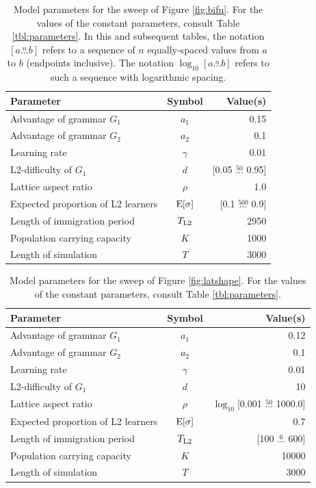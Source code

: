 \begin{table}\caption{Model parameters for the sweep of Figure \ref{fig:bifu}. For the values of the constant parameters, consult Table \ref{tbl:parameters}. In this and subsequent tables, the notation $[a \stackrel{n}{\dots} b]$ refers to a sequence of $n$ equally-spaced values from $a$ to $b$ (endpoints inclusive). The notation $\log_{10}[a \stackrel{n}{\dots} b]$ refers to such a sequence with logarithmic spacing.}\label{tbl:bifu}\begin{tabular}{lcr}
\toprule
Parameter & Symbol & Value(s) \\
\midrule
Advantage of grammar $G_1$ & $a_1$ & 0.15 \\
Advantage of grammar $G_2$ & $a_2$ & 0.1 \\
Learning rate & $\gamma$ & 0.01 \\
L2-difficulty of $G_1$ & $d$ & [0.05 $\stackrel{50}{\ldots}$ 0.95] \\
Lattice aspect ratio & $\rho$ & 1.0 \\
Expected proportion of L2 learners & $\textnormal{E}[\sigma]$ & [0.1 $\stackrel{500}{\ldots}$ 0.9] \\
Length of immigration period & $T_\textnormal{L2}$ & 2950 \\
Population carrying capacity & $K$ & 1000 \\
Length of simulation & $T$ & 3000 \\
\bottomrule
\end{tabular}
\end{table}

\begin{table}\caption{Model parameters for the sweep of Figure \ref{fig:latshape}. For the values of the constant parameters, consult Table \ref{tbl:parameters}.}\label{tbl:latshape}\begin{tabular}{lcr}
\toprule
Parameter & Symbol & Value(s) \\
\midrule
Advantage of grammar $G_1$ & $a_1$ & 0.12 \\
Advantage of grammar $G_2$ & $a_2$ & 0.1 \\
Learning rate & $\gamma$ & 0.01 \\
L2-difficulty of $G_1$ & $d$ & 10 \\
Lattice aspect ratio & $\rho$ & $\log_{10}$[0.001 $\stackrel{50}{\ldots}$ 1000.0] \\
Expected proportion of L2 learners & $\textnormal{E}[\sigma]$ & 0.7 \\
Length of immigration period & $T_\textnormal{L2}$ & [100 $\stackrel{6}{\ldots}$ 600] \\
Population carrying capacity & $K$ & 10000 \\
Length of simulation & $T$ & 3000 \\
\bottomrule
\end{tabular}
\end{table}

